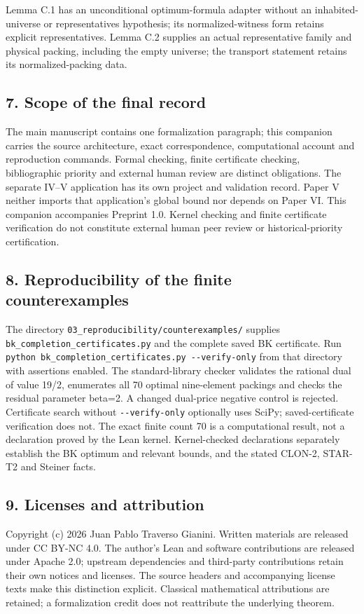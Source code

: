 \documentclass[english,11pt,a4paper]{article}
\begin{document}
Lemma C.1 has an unconditional optimum-formula adapter without an
inhabited-universe or representatives hypothesis; its normalized-witness
form retains explicit representatives. Lemma C.2 supplies an actual
representative family and physical packing, including the empty
universe; the transport statement retains its normalized-packing data.

\subsection{7. Scope of the final
record}\label{scope-of-the-final-record}

The main manuscript contains one formalization paragraph; this companion
carries the source architecture, exact correspondence, computational
account and reproduction commands. Formal checking, finite certificate
checking, bibliographic priority and external human review are distinct
obligations. The separate IV--V application has its own project and
validation record. Paper V neither imports that application's global
bound nor depends on Paper VI. This companion accompanies Preprint 1.0.
Kernel checking and finite certificate verification do not constitute
external human peer review or historical-priority certification.

\subsection{8. Reproducibility of the finite
counterexamples}\label{reproducibility-of-the-finite-counterexamples}

The directory \nolinkurl{03_reproducibility/counterexamples/} supplies
\nolinkurl{bk_completion_certificates.py} and the complete saved BK
certificate. Run
\texttt{python\ bk\_completion\_certificates.py\ -\/-verify-only} from
that directory with assertions enabled. The standard-library checker
validates the rational dual of value 19/2, enumerates all 70 optimal
nine-element packings and checks the residual parameter beta=2. A
changed dual-price negative control is rejected. Certificate search
without \texttt{-\/-verify-only} optionally uses SciPy;
saved-certificate verification does not. The exact finite count 70 is a
computational result, not a declaration proved by the Lean kernel.
Kernel-checked declarations separately establish the BK optimum and
relevant bounds, and the stated CLON-2, STAR-T2 and Steiner facts.

\subsection{9. Licenses and attribution}\label{licenses-and-attribution}

Copyright (c) 2026 Juan Pablo Traverso Gianini. Written materials are
released under CC BY-NC 4.0. The author's Lean and software
contributions are released under Apache 2.0; upstream dependencies and
third-party contributions retain their own notices and licenses. The
source headers and accompanying license texts make this distinction
explicit. Classical mathematical attributions are retained; a
formalization credit does not reattribute the underlying theorem.
\end{document}
